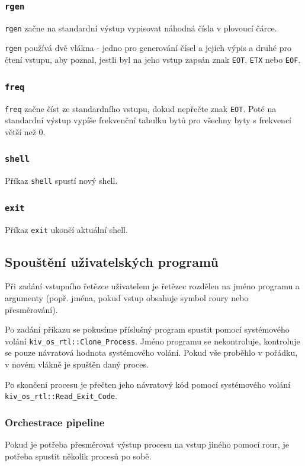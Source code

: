 \documentclass[12pt, a4paper]{article}
\begin{document}
    \subsubsection*{\texttt{rgen}}
    \texttt{rgen} začne na standardní výstup vypisovat náhodná čísla v plovoucí čárce.
    
    \texttt{rgen} používá dvě vlákna - jedno pro generování čísel a jejich výpis a druhé pro čtení vstupu, aby poznal, jestli byl na jeho vstup zapsán znak \texttt{EOT}, \texttt{ETX} nebo \texttt{EOF}.
    
    \subsubsection*{\texttt{freq}}
    \texttt{freq} začne číst ze standardního vstupu, dokud nepřečte znak \texttt{EOT}. Poté na standardní výstup vypíše frekvenční tabulku bytů pro všechny byty s frekvencí větší než 0.
    
    \subsubsection*{\texttt{shell}}
    Příkaz \texttt{shell} spustí nový shell.
    
    \subsubsection*{\texttt{exit}}
    Příkaz \texttt{exit} ukončí aktuální shell.
	
	
	\subsection{Spouštění uživatelských programů}
	Při zadání vstupního řetězce uživatelem je řetězec rozdělen na jméno programu a argumenty (popř. jména, pokud vstup obsahuje symbol roury nebo přesměrování).	
	
	
	Po zadání příkazu se pokusíme příslušný program spustit pomocí systémového volání \texttt{kiv\_os\_rtl::Clone\_Process}. Jméno programu se nekontroluje, kontroluje se pouze návratová hodnota systémového volání. Pokud vše proběhlo v pořádku, v novém vlákně je spuštěn daný proces.
	
	Po skončení procesu je přečten jeho návratový kód pomocí systémového volání \texttt{kiv\_os\_rtl::Read\_Exit\_Code}.
	
	\subsubsection{Orchestrace pipeline} 
	Pokud je potřeba přesměrovat výstup procesu na vstup jiného pomocí rour, je potřeba spustit několik procesů po sobě. 
\end{document}
